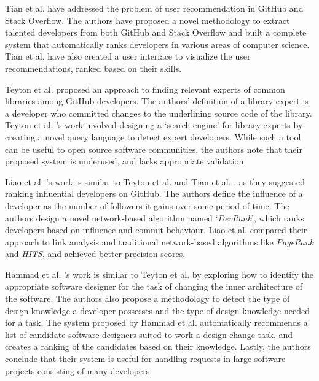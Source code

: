         Tian et al. \cite{tian2019geek} have addressed the problem of user recommendation in GitHub and Stack Overflow. The authors have proposed a novel methodology to extract talented developers from both GitHub and Stack Overflow and built a complete system that automatically ranks developers in various areas of computer science. Tian et al. have also created a user interface to visualize the user recommendations, ranked based on their skills.
        
        Teyton et al. \cite{teyton2013find} proposed an approach to finding relevant experts of common libraries among GitHub developers. The authors' definition of a library expert is a developer who committed changes to the underlining source code of the library. Teyton et al. \cite{teyton2013find}'s work involved designing a `search engine' for library experts by creating a novel query language to detect expert developers. While such a tool can be useful to open source software communities, the authors note that their proposed system is underused, and lacks appropriate validation. 
        
        Liao et al. \cite{liao2017devrank}'s work is similar to Teyton et al. \cite{teyton2013find} and Tian et al. \cite{tian2019geek}, as they suggested ranking influential developers on GitHub. The authors define the influence of a developer as the number of followers it gains over some period of time. The authors design a novel network-based algorithm named `\emph{DevRank}', which ranks developers based on influence and commit behaviour. Liao et al. compared their approach to link analysis and traditional network-based algorithms like \emph{PageRank} and \emph{HITS}, and achieved better precision scores.
        
        Hammad et al. \cite{hammad2013identifying}'s work is similar to Teyton et al. \cite{teyton2013find} by exploring how to identify the appropriate software designer for the task of changing the inner architecture of the software. The authors also propose a methodology to detect the type of design knowledge a developer possesses and the type of design knowledge needed for a task. The system proposed by Hammad et al. automatically recommends a list of candidate software designers suited to work a design change task, and creates a ranking of the candidates based on their knowledge. Lastly, the authors conclude that their system is useful for handling requests in large software projects consisting of many developers.
        

